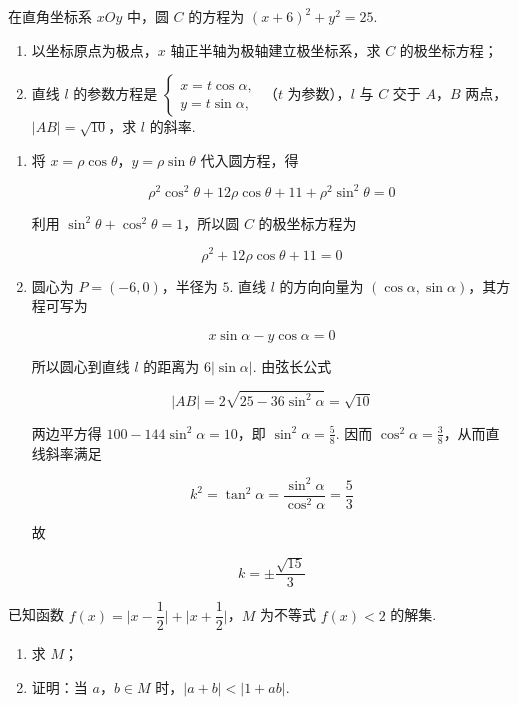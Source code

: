 \begin{problem}
在直角坐标系 \(xOy\) 中，圆 \(C\) 的方程为 \((x+6)^2+y^2=25\).
\begin{enumerate}
\item 以坐标原点为极点，\(x\) 轴正半轴为极轴建立极坐标系，求 \(C\) 的极坐标方程；
\item 直线 \(l\) 的参数方程是
\(
\begin{cases}
x=t\cos\alpha,\\
y=t\sin\alpha,
\end{cases}
\)
（\(t\) 为参数），\(l\) 与 \(C\) 交于 \(A\)，\(B\) 两点，\(\lvert AB\rvert=\sqrt{10}\)，求 \(l\) 的斜率.
\end{enumerate}
\end{problem}

\begin{solution}
\begin{enumerate}
\item 将 \(x=\rho\cos\theta\)，\(y=\rho\sin\theta\) 代入圆方程，得

\[
\rho^2\cos^2\theta+12\rho\cos\theta+11+\rho^2\sin^2\theta=0
\]

利用 \(\sin^2\theta+\cos^2\theta=1\)，所以圆 \(C\) 的极坐标方程为

\[
\rho^2+12\rho\cos\theta+11=0
\]

\item 圆心为 \(P=(-6,0)\)，半径为 \(5\). 直线 \(l\) 的方向向量为 \((\cos\alpha,\sin\alpha)\)，其方程可写为

\[
x\sin\alpha-y\cos\alpha=0
\]

所以圆心到直线 \(l\) 的距离为 \(6|\sin\alpha|\). 由弦长公式

\[
|AB|=2\sqrt{25-36\sin^2\alpha}=\sqrt{10}
\]

两边平方得 \(100-144\sin^2\alpha=10\)，即 \(\sin^2\alpha=\frac{5}{8}\). 因而 \(\cos^2\alpha=\frac{3}{8}\)，从而直线斜率满足

\[
k^2=\tan^2\alpha=\frac{\sin^2\alpha}{\cos^2\alpha}=\frac53
\]

故

\[
k=\pm\frac{\sqrt{15}}3
\]
\end{enumerate}
\end{solution}


\begin{problem}
已知函数 \(f(x)=\lvert x-\dfrac12\rvert+\lvert x+\dfrac12\rvert\)，\(M\) 为不等式 \(f(x)<2\) 的解集.
\begin{enumerate}
\item 求 \(M\)；
\item 证明：当 \(a\)，\(b\in M\) 时，\(\lvert a+b\rvert<\lvert 1+ab\rvert\).
\end{enumerate}
\end{problem}

